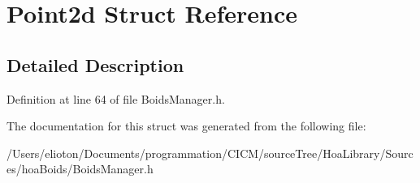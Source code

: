 \hypertarget{struct_point2d}{\section{Point2d Struct Reference}
\label{struct_point2d}
}


\subsection{Detailed Description}


Definition at line 64 of file Boids\-Manager.\-h.



The documentation for this struct was generated from the following file\-:\begin{DoxyCompactItemize}
\item 
/\-Users/elioton/\-Documents/programmation/\-C\-I\-C\-M/source\-Tree/\-Hoa\-Library/\-Sources/hoa\-Boids/Boids\-Manager.\-h\end{DoxyCompactItemize}
